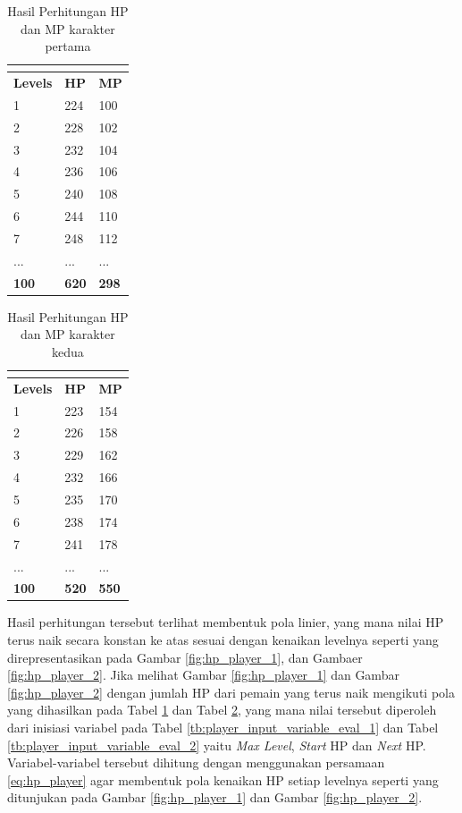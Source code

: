 \begin{longtable}{|l|l|l|}
	\caption{Hasil Perhitungan HP dan MP karakter pertama}
	\vspace{1ex}
	\label{tb:player_hp_mp_1}\\
	\hline
	\rowcolor[HTML]{C0C0C0} 
	\textbf{Levels} & \textbf{HP} & \textbf{MP} \\ \hline
	1 & 224 & 100 \\ \hline
	2 & 228 & 102 \\ \hline
	3 & 232 & 104 \\ \hline
	4 & 236 & 106 \\ \hline
	5 & 240 & 108 \\ \hline
	6 & 244 & 110 \\ \hline
	7 & 248 & 112 \\ \hline
	... & ... & ... \\ \hline
	\textbf{100} & \textbf{620} & \textbf{298} \\ \hline
\end{longtable}
\vspace{1ex}

\begin{longtable}{|l|l|l|}
	\caption{Hasil Perhitungan HP dan MP karakter kedua}
	\vspace{1ex}
	\label{tb:player_hp_mp_2}\\
	\hline
	\rowcolor[HTML]{C0C0C0} 
	\textbf{Levels} & \textbf{HP} & \textbf{MP} \\ \hline
	1 & 223 & 154 \\ \hline
	2 & 226 & 158 \\ \hline
	3 & 229 & 162 \\ \hline
	4 & 232 & 166 \\ \hline
	5 & 235 & 170 \\ \hline
	6 & 238 & 174 \\ \hline
	7 & 241 & 178 \\ \hline
	... & ... & ... \\ \hline
	\textbf{100} & \textbf{520} & \textbf{550} \\ \hline
\end{longtable}
\vspace{1ex}

Hasil perhitungan tersebut terlihat membentuk pola linier, yang mana nilai HP terus naik secara konstan ke atas sesuai dengan kenaikan levelnya seperti yang direpresentasikan pada Gambar \ref{fig:hp_player_1}, dan Gambaer \ref{fig:hp_player_2}. Jika melihat Gambar \ref{fig:hp_player_1} dan Gambar \ref{fig:hp_player_2} dengan jumlah HP dari pemain yang terus naik mengikuti pola yang dihasilkan pada Tabel \ref{tb:player_hp_mp_1} dan Tabel \ref{tb:player_hp_mp_2}, yang mana nilai tersebut diperoleh dari inisiasi variabel pada Tabel \ref{tb:player_input_variable_eval_1} dan Tabel \ref{tb:player_input_variable_eval_2} yaitu \textit{Max Level}, \textit{Start} HP dan \textit{Next} HP. Variabel-variabel tersebut dihitung dengan menggunakan persamaan \ref{eq:hp_player} agar membentuk pola kenaikan HP setiap levelnya seperti yang ditunjukan pada Gambar \ref{fig:hp_player_1} dan Gambar \ref{fig:hp_player_2}. 
\vspace{1ex}

